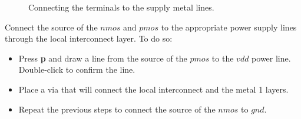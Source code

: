 {\begin{figure}
				\caption{Connecting the terminals to the supply metal lines.}
	\end{figure}
	Connect the source of the $nmos$ and $pmos$ to the appropriate power supply lines through the local interconnect layer. To do so:
	\begin{itemize}
		\item Press \textbf{p} and draw a line from the source of the $pmos$ to the $vdd$ power line. Double-click to confirm the line.
		\item Place a via that will connect the local interconnect and the metal 1 layers.
		\item Repeat the previous steps to connect the source of the $nmos$ to $gnd$.\end{itemize}
}


		\vspace{26mm}
